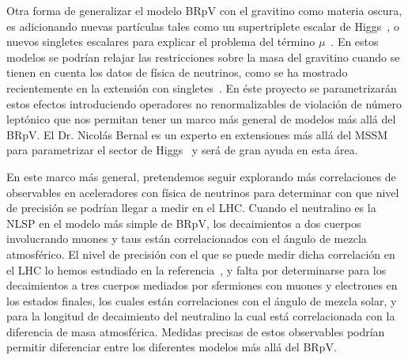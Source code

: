 \begin{bbrpvlhc}
  Otra forma de generalizar el modelo BRpV con el gravitino como
  materia oscura, es adicionando nuevas partículas tales como un
  supertriplete escalar de Higgs~\cite{AristizabalSierra:2003ix}, o
  nuevos singletes escalares para explicar el problema del término
  $\mu$~\cite{LopezFogliani:2005yw}. En estos modelos se podrían
  relajar las restricciones sobre la masa del gravitino cuando se
  tienen en cuenta los datos de física de neutrinos, como se ha
  mostrado recientemente en la extensión con
  singletes~\cite{GomezVargas:2011ph}. En éste proyecto se
  parametrizarán estos efectos introduciendo operadores no
  renormalizables de violación de número leptónico que nos permitan
  tener un marco más general de modelos más allá del BRpV. El
  Dr. Nicolás Bernal es un experto en extensiones más allá del MSSM
  para parametrizar el sector de
  Higgs~\cite{Bernal:2007uv,Bernal:2009hd} y será de gran ayuda en
  esta área.
\end{bbrpvlhc}

\begin{brpvlhc}
  En este marco más general, pretendemos seguir explorando más
  correlaciones de observables en aceleradores con física de neutrinos
  para determinar con que nivel de precisión se podrían llegar a medir
  en el LHC. Cuando el neutralino es la NLSP en el modelo más simple
  de BRpV, los decaimientos a dos cuerpos involucrando muones y taus
  están correlacionados con el ángulo de mezcla atmosférico. El nivel
  de precisión con el que se puede medir dicha correlación en el LHC
  lo hemos estudiado en la referencia~\cite{DeCampos:2010yu}, y falta por
  determinarse para los decaimientos a tres cuerpos mediados por
  sfermiones con muones y electrones en los estados finales, los
  cuales están correlaciones con el ángulo de mezcla solar, y para la
  longitud de decaimiento del neutralino la cual está correlacionada
  con la diferencia de masa atmosférica. Medidas precisas de estos
  observables podrían permitir diferenciar entre los diferentes
  modelos más allá del BRpV.
\end{brpvlhc}

